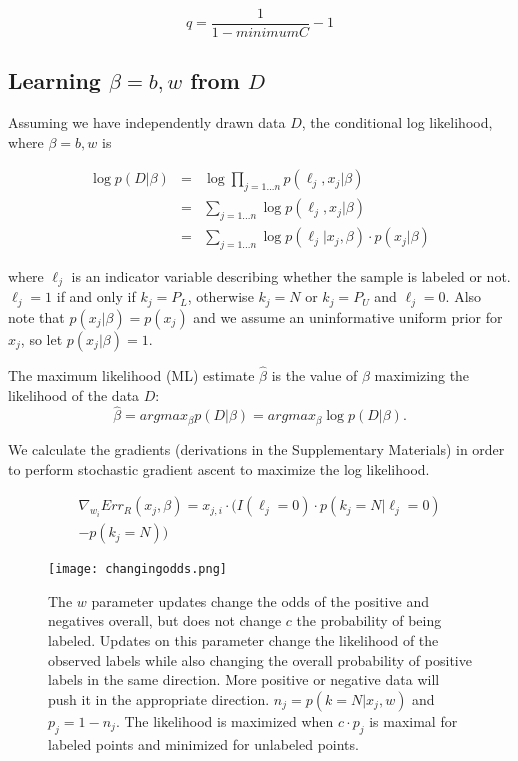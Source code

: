 \documentclass{article}
\begin{document}
$$q = \frac{1}{1 - minimumC} - 1$$

\subsection{Learning $\beta = b, w$ from $D$}

Assuming we have independently drawn data $D$, the conditional log likelihood, where $\beta = b, w$ is

\begin{eqnarray*}
\log{p(D | \beta)} &=& \log \prod_{j=1...n}{p(\ell_j, x_j | \beta)} \\
 &=& \sum_{j=1...n}{\log{p(\ell_j, x_j | \beta)}} \\
 &=& \sum_{j=1...n}{\log{p(\ell_j | x_j, \beta)}} \cdot p(x_j | \beta)
\end{eqnarray*}

where $\ell_j$ is an indicator variable describing whether the sample is labeled or not. $\ell_j = 1$ if and only if $k_j=P_L$, otherwise $k_j = N$ or $k_j=P_U$ and $\ell_j = 0$.  Also note that $p(x_j|\beta) = p(x_j)$ and we assume an uninformative uniform prior for $x_j$, so let $p(x_j|\beta) = 1$.

The maximum likelihood (ML) estimate $\hat \beta$ is the value of $\beta$ maximizing the likelihood of the data $D$:
$$
\hat \beta = arg max_{\beta} p(D | \beta) = arg max_{\beta} \log{p(D | \beta)}.
$$

We calculate the gradients (derivations in the Supplementary Materials) in order to perform stochastic gradient ascent to maximize the log likelihood.

\begin{eqnarray*}
\nabla_{w_i}{Err_R (x_j, \beta)} = x_{j,i} \cdot
    \big(	I(\ell_j=0) \cdot p(k_j=N | \ell_j=0) \\
		- p(k_j=N)
    \big)
\end{eqnarray*}

\begin{figure}[ht!]
\vskip 0.2in
\begin{center}
\centerline{\texttt{[image: changingodds.png]}}
\caption{The $w$ parameter updates change the odds of the positive and negatives overall, but does not change $c$ the probability of being labeled. Updates on this parameter change the likelihood of the observed labels while also changing the overall probability of positive labels in the same direction. More positive or negative data will push it in the appropriate direction. $n_j = p(k=N|x_j,w)$ and $p_j = 1-n_j$. The likelihood is maximized when $c \cdot p_{j}$ is maximal for labeled points and minimized for unlabeled points. }
\label{changingodds}
\end{center}
\vskip -0.2in
\end{figure}
\end{document}
